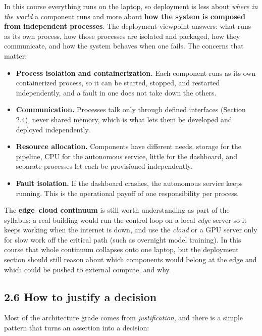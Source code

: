 \documentclass[
  11pt,
]{article}
\providecommand{\tightlist}{%
  \setlength{\itemsep}{0pt}\setlength{\parskip}{0pt}}
\begin{document}
In this course everything runs on the laptop, so deployment is less
about \emph{where in the world} a component runs and more about
\textbf{how the system is composed from independent processes}. The
deployment viewpoint answers: what runs as its own process, how those
processes are isolated and packaged, how they communicate, and how the
system behaves when one fails. The concerns that matter:

\begin{itemize}
\tightlist
\item
  \textbf{Process isolation and containerization.} Each component runs
  as its own containerized process, so it can be started, stopped, and
  restarted independently, and a fault in one does not take down the
  others.
\item
  \textbf{Communication.} Processes talk only through defined interfaces
  (Section 2.4), never shared memory, which is what lets them be
  developed and deployed independently.
\item
  \textbf{Resource allocation.} Components have different needs, storage for the pipeline, CPU for the autonomous service, little for
  the dashboard, and separate processes let each be provisioned
  independently.
\item
  \textbf{Fault isolation.} If the dashboard crashes, the autonomous
  service keeps running. This is the operational payoff of one
  responsibility per process.
\end{itemize}

The \textbf{edge--cloud continuum} is still worth understanding as part
of the syllabus: a real building would run the control loop on a local
\emph{edge} server so it keeps working when the internet is down, and
use the \emph{cloud} or a GPU server only for slow work off the critical
path (such as overnight model training). In this course that whole
continuum collapses onto one laptop, but the deployment section
should still reason about which components would belong at the edge and
which could be pushed to external compute, and why.

\hypertarget{how-to-justify-a-decision}{%
\subsection{2.6 How to justify a
decision}\label{how-to-justify-a-decision}}

Most of the architecture grade comes from \emph{justification}, and
there is a simple pattern that turns an assertion into a decision:
\end{document}
